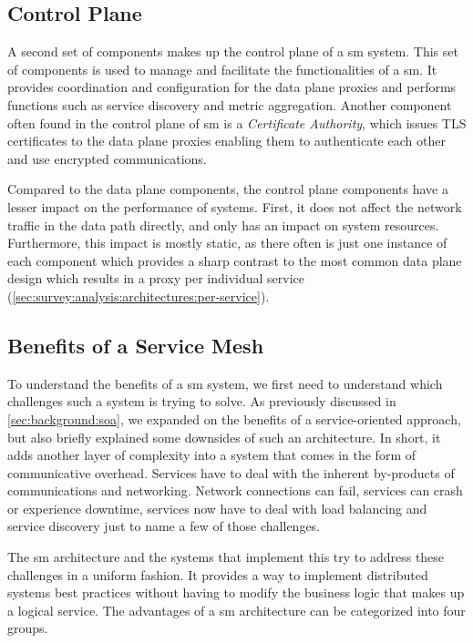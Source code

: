 \subsection{Control Plane}
\label{sec:background:service-mesh:control-plane}

A second set of components makes up the control plane of a \gls{sm} system. This set of components is used to manage and facilitate the functionalities of a \gls{sm}. It provides coordination and configuration for the data plane proxies and performs functions such as service discovery and metric aggregation. Another component often found in the control plane of \gls{sm} is a \textit{Certificate Authority}, which issues TLS certificates to the data plane proxies enabling them to authenticate each other and use encrypted communications. 

Compared to the data plane components, the control plane components have a lesser impact on the performance of systems. First, it does not affect the network traffic in the data path directly, and only has an impact on system resources. Furthermore, this impact is mostly static, as there often is just one instance of each component which provides a sharp contrast to the most common data plane design which results in a proxy per individual service (\cref{sec:survey:analysis:architectures:per-service}). 

\subsection{Benefits of a Service Mesh}
\label{sec:background:service-mesh:benefits}

To understand the benefits of a \gls{sm} system, we first need to understand which challenges such a system is trying to solve. As previously discussed in \cref{sec:background:soa}, we expanded on the benefits of a service-oriented approach, but also briefly explained some downsides of such an architecture. In short, it adds another layer of complexity into a system that comes in the form of communicative overhead. Services have to deal with the inherent by-products of communications and networking. Network connections can fail, services can crash or experience downtime, services now have to deal with load balancing and service discovery just to name a few of those challenges. 

The \gls{sm} architecture and the systems that implement this try to address these challenges in a uniform fashion. It provides a way to implement distributed systems best practices without having to modify the business logic that makes up a logical service. The advantages of a \gls{sm} architecture can be categorized into four groups.

